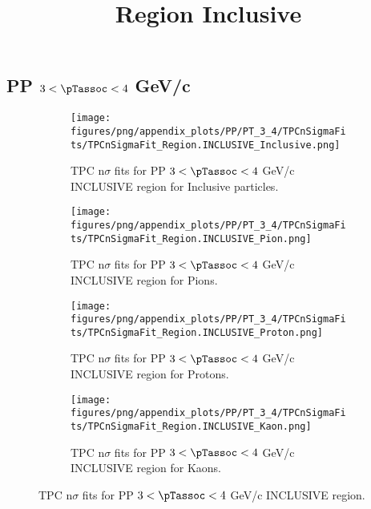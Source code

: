     
            \subsection*{PP $3 < \pTassoc < 4$ GeV/c}
            \begin{figure}[H]
                \title{Region Inclusive}
                \begin{subfigure}[b]{0.5\textwidth}
                    \centering
                    \texttt{[image: figures/png/appendix\_plots/PP/PT\_3\_4/TPCnSigmaFits/TPCnSigmaFit\_Region.INCLUSIVE\_Inclusive.png]}
                    \caption{TPC n$\sigma$ fits for PP $3 < \pTassoc < 4$ GeV/c INCLUSIVE region for Inclusive particles.}
                    \label{fig:appendix_PP_$3 < \pTassoc < 4$ GeV/c_INCLUSIVE_Inclusive}
                \end{subfigure}
                \begin{subfigure}[b]{0.5\textwidth}
                    \centering
                    \texttt{[image: figures/png/appendix\_plots/PP/PT\_3\_4/TPCnSigmaFits/TPCnSigmaFit\_Region.INCLUSIVE\_Pion.png]}
                    \caption{TPC n$\sigma$ fits for PP $3 < \pTassoc < 4$ GeV/c INCLUSIVE region for Pions.}
                    \label{fig:appendix_PP_$3 < \pTassoc < 4$ GeV/c_INCLUSIVE_Pion}
                \end{subfigure}
                \begin{subfigure}[b]{0.5\textwidth}
                    \centering
                    \texttt{[image: figures/png/appendix\_plots/PP/PT\_3\_4/TPCnSigmaFits/TPCnSigmaFit\_Region.INCLUSIVE\_Proton.png]}
                    \caption{TPC n$\sigma$ fits for PP $3 < \pTassoc < 4$ GeV/c INCLUSIVE region for Protons.}
                    \label{fig:appendix_PP_$3 < \pTassoc < 4$ GeV/c_INCLUSIVE_Proton}
                \end{subfigure}
                \begin{subfigure}[b]{0.5\textwidth}
                    \centering
                    \texttt{[image: figures/png/appendix\_plots/PP/PT\_3\_4/TPCnSigmaFits/TPCnSigmaFit\_Region.INCLUSIVE\_Kaon.png]}
                    \caption{TPC n$\sigma$ fits for PP $3 < \pTassoc < 4$ GeV/c INCLUSIVE region for Kaons.}
                    \label{fig:appendix_PP_$3 < \pTassoc < 4$ GeV/c_INCLUSIVE_Kaon}
                \end{subfigure}
                \caption{TPC n$\sigma$ fits for PP $3 < \pTassoc < 4$ GeV/c INCLUSIVE region.}
                \label{fig:appendix_PP_$3 < \pTassoc < 4$ GeV/c_INCLUSIVE}
            \end{figure}
